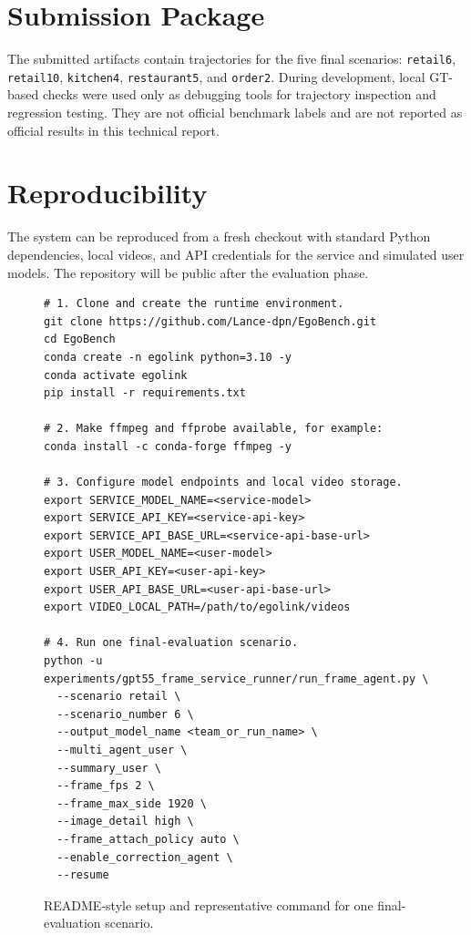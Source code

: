 \documentclass[sigconf,nonacm]{acmart}
\begin{document}
\section{Submission Package}

The submitted artifacts contain trajectories for the five final scenarios:
\texttt{retail6}, \texttt{retail10}, \texttt{kitchen4},
\texttt{restaurant5}, and \texttt{order2}. During development, local GT-based
checks were used only as debugging tools for trajectory inspection and
regression testing. They are not official benchmark labels and are not reported
as official results in this technical report.

\section{Reproducibility}

The system can be reproduced from a fresh checkout with standard Python
dependencies, local videos, and API credentials for the service and simulated
user models. The repository will be public after the evaluation phase.

\begin{figure}[t]
\begin{verbatim}
# 1. Clone and create the runtime environment.
git clone https://github.com/Lance-dpn/EgoBench.git
cd EgoBench
conda create -n egolink python=3.10 -y
conda activate egolink
pip install -r requirements.txt

# 2. Make ffmpeg and ffprobe available, for example:
conda install -c conda-forge ffmpeg -y

# 3. Configure model endpoints and local video storage.
export SERVICE_MODEL_NAME=<service-model>
export SERVICE_API_KEY=<service-api-key>
export SERVICE_API_BASE_URL=<service-api-base-url>
export USER_MODEL_NAME=<user-model>
export USER_API_KEY=<user-api-key>
export USER_API_BASE_URL=<user-api-base-url>
export VIDEO_LOCAL_PATH=/path/to/egolink/videos

# 4. Run one final-evaluation scenario.
python -u experiments/gpt55_frame_service_runner/run_frame_agent.py \
  --scenario retail \
  --scenario_number 6 \
  --output_model_name <team_or_run_name> \
  --multi_agent_user \
  --summary_user \
  --frame_fps 2 \
  --frame_max_side 1920 \
  --image_detail high \
  --frame_attach_policy auto \
  --enable_correction_agent \
  --resume
\end{verbatim}
\caption{README-style setup and representative command for one final-evaluation
scenario.}
\label{fig:run-command}
\end{figure}
\end{document}

